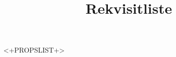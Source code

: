 \documentclass[a4paper,11pt,oneside]{article}
\title{Rekvisitliste}
\begin{document}
\maketitle

\setlength\LTleft{0pt}
\setlength\LTright{0pt}

<+PROPSLIST+>
\end{document}
